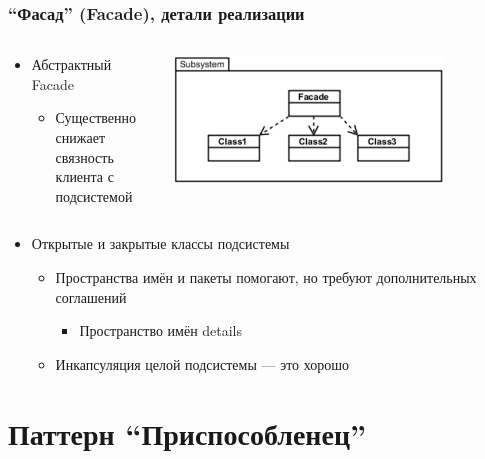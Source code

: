 \documentclass[xetex,mathserif,serif]{beamer}
\begin{document}
	\begin{frame}
		\frametitle{``Фасад'' (Facade), детали реализации}
		\begin{columns}
			\begin{column}{0.5\textwidth}
				\begin{itemize}
					\item Абстрактный Facade
					\begin{itemize}
						\item Существенно снижает связность клиента с подсистемой
					\end{itemize}
				\end{itemize}
			\end{column}
			\begin{column}{0.5\textwidth}
				\begin{center}
					\includegraphics[width=0.8\textwidth]{facade.png}
				\end{center}
			\end{column}
		\end{columns}
		\begin{itemize}
			\item Открытые и закрытые классы подсистемы
			\begin{itemize}
				\item Пространства имён и пакеты помогают, но требуют дополнительных соглашений
				\begin{itemize}
					\item Пространство имён details
				\end{itemize}
				\item Инкапсуляция целой подсистемы --- это хорошо
			\end{itemize}
		\end{itemize}
	\end{frame}

	\section{Паттерн ``Приспособленец''}
\end{document}
